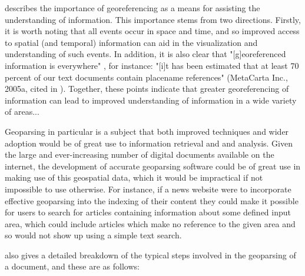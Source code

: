 \documentclass[12pt, a4paper]{report}
\begin{document}
\citet{hill2006} describes the importance of georeferencing as a means for assisting the understanding of information. This importance stems from two directions. Firstly, it is worth noting that all events occur in space and time, and so improved access to spatial (and temporal) information can aid in the visualization and understanding of such events. In addition, it is also clear that "[g]eoreferenced information is everywhere" \citep{hill2006}, for instance: "[i]t has been estimated that at least 70 percent of our text documents contain placename references" (MetaCarta Inc., 2005a, cited in \citet[p.~5]{hill2006}). Together, these points indicate that greater georeferencing of information can lead to improved understanding of information in a wide variety of areas...

Geoparsing in particular is a subject that both improved techniques and wider adoption would be of great use to information retrieval and and analysis. Given the large and ever-increasing number of digital documents available on the internet, the development of accurate geoparsing software could be of great use in making use of this geospatial data, which it would be impractical if not impossible to use otherwise. For instance, if a news website were to incorporate effective geoparsing into the indexing of their content they could make it possible for users to search for articles containing information about some defined input area, which could include articles which make no reference to the given area and so would not show up using a simple text search.

\citet{hill2006} also gives a detailed breakdown of the typical steps involved in the geoparsing of a document, and these are as follows:
\end{document}
